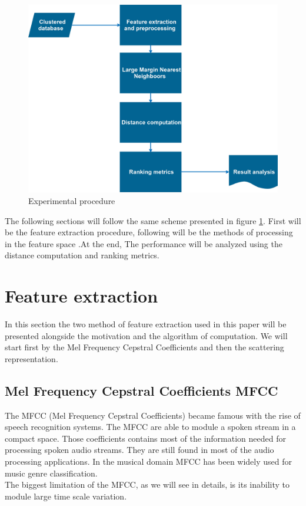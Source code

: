 \documentclass[hidelinks,12pt]{report}
\begin{document}
\begin{figure}[t!]
  
  \centering
	    \includegraphics[width=1\textwidth]{experimental_procedure}
    \caption{Experimental procedure }
    \label{expermient}
\end{figure}
The following sections will follow the same scheme presented in figure \ref{expermient}. First will be the feature extraction procedure, following will be the methods of processing in the feature space .At the end, The performance will be analyzed using the distance computation and ranking metrics.

\section{Feature extraction}
In this section the two method of feature extraction used in this paper will be presented alongside the motivation and the algorithm of computation. We will start first by the Mel Frequency Cepstral Coefficients and then the scattering representation. 
\subsection{Mel Frequency Cepstral Coefficients MFCC}
The MFCC (Mel Frequency Cepstral Coefficients)  became famous with the rise of speech recognition systems. The MFCC are able to module a spoken stream in a compact space. Those coefficients contains most of the information needed for processing spoken audio streams. They are still found in most of the audio processing applications. In the musical domain MFCC has been widely used for music genre classification.\\ The biggest limitation of the MFCC, as we will see in details, is its inability to module large time scale variation.
\end{document}
